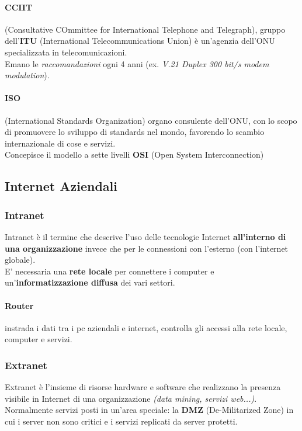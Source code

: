 \documentclass[a4paper,11pt]{article}
\begin{document}
\paragraph{CCIIT} (Consultative COmmittee for International Telephone and Telegraph), gruppo dell'\textbf{ITU} (International Telecommunications Union) è un'agenzia dell'ONU specializzata in telecomunicazioni.\\
Emano le \textit{raccomandazioni} ogni 4 anni (ex. \textit{V.21 Duplex 300 bit/s modem modulation}).
\paragraph{ISO} (International Standards Organization) organo consulente dell'ONU, con lo scopo di promuovere lo sviluppo di standards nel mondo, favorendo lo scambio internazionale di cose e servizi. \\
Concepisce il modello a sette livelli \textbf{OSI} (Open System Interconnection)

\subsection{Internet Aziendali}
\subsubsection{Intranet}
Intranet è il termine che descrive l'uso delle tecnologie Internet \textbf{all'interno di una organizzazione} invece che per le connessioni con l'esterno (con l'internet globale).\\
E' necessaria una \textbf{rete locale} per connettere i computer e un'\textbf{informatizzazione diffusa} dei vari settori.
\paragraph{Router} instrada i dati tra i pc aziendali e internet, controlla gli accessi alla rete locale, computer e servizi.
\subsubsection{Extranet}
Extranet è l'insieme di risorse hardware e software che realizzano la presenza visibile in Internet di una organizzazione \textit{(data mining, servizi web...)}. Normalmente servizi posti in un'area speciale: la \textbf{DMZ} (De-Militarized Zone) in cui i server non sono critici e i servizi replicati da server protetti.
\end{document}
